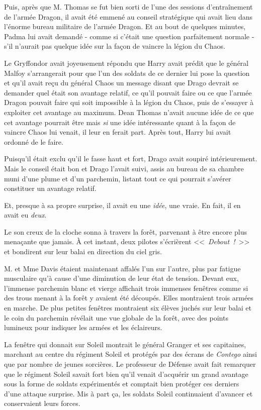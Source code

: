 Puis, après que M. Thomas se fut bien sorti de l'une des sessions d'entraînement de l'armée Dragon, il avait été emmené au conseil stratégique qui avait lieu dans l'énorme bureau militaire de l'armée Dragon. Et au bout de quelques minutes, Padma lui avait demandé - comme si c'était une question parfaitement normale - s'il n'aurait pas quelque idée sur la façon de vaincre la légion du Chaos.

Le Gryffondor avait joyeusement répondu que Harry avait prédit que le général Malfoy s'arrangerait pour que l'un des soldats de ce dernier lui pose la question et qu'il avait reçu du général Chaos un message disant que Drago devrait se demander quel était son avantage relatif, ce qu'il pouvait faire ou ce que l'armée Dragon pouvait faire qui soit impossible à la légion du Chaos, puis de s'essayer à exploiter cet avantage au maximum. Dean Thomas n'avait aucune idée de ce que cet avantage pourrait être mais \emph{si} une idée intéressante quant à la façon de vaincre Chaos lui venait, il leur en ferait part. Après tout, Harry lui avait ordonné de le faire.

Puisqu'il était exclu qu'il le fasse haut et fort, Drago avait soupiré intérieurement. Mais le conseil était bon et Drago l'avait suivi, assis au bureau de sa chambre muni d'une plume et d'un parchemin, listant tout ce qui pourrait s'avérer constituer un avantage relatif.

Et, presque à sa propre surprise, il avait eu une \emph{idée}, une vraie. En fait, il en avait eu \emph{deux}.

Le son creux de la cloche sonna à travers la forêt, parvenant à être encore plus menaçante que jamais. À cet instant, deux pilotes s'écrièrent <<~\emph{Debout~!}~>> et bondirent sur leur balai en direction du ciel gris.

\later

M. et Mme Davis étaient maintenant affalés l'un sur l'autre, plus par fatigue musculaire qu'à cause d'une diminution de leur état de tension. Devant eux, l'immense parchemin blanc et vierge affichait trois immenses fenêtres comme si des trous menant à la forêt y avaient été découpés. Elles montraient trois armées en marche. De plus petites fenêtres montraient six élèves juchés sur leur balai et le coin du parchemin révélait une vue globale de la forêt, avec des points lumineux pour indiquer les armées et les éclaireurs.

La fenêtre qui donnait sur Soleil montrait le général Granger et ses capitaines, marchant au centre du régiment Soleil et protégés par des écrans de \emph{Contego} ainsi que par nombre de jeunes sorcières. Le professeur de Défense avait fait remarquer que le régiment Soleil savait fort bien qu'il venait d'acquérir un grand avantage sous la forme de soldats expérimentés et comptait bien protéger ces derniers d'une attaque surprise. Mis à part ça, les soldats Soleil continuaient d'avancer et conservaient leurs forces.

